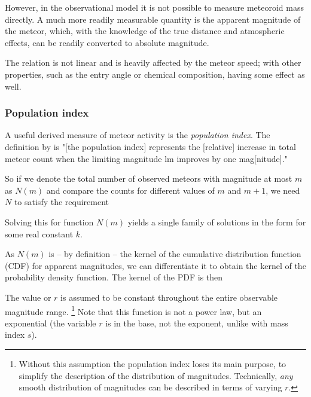             However, in the observational model it is not possible to measure meteoroid mass directly.
            A much more readily measurable quantity is the apparent magnitude of the meteor, which,
            with the knowledge of the true distance and atmospheric effects, can be readily converted
            to absolute magnitude.

            The relation is not linear and is heavily affected by the meteor speed; with other properties,
            such as the entry angle or chemical composition, having some effect as well.

        \subsubsection{Population index} \label{msar}
            A useful derived measure of meteor activity is the \emph{population index}.
            The definition by \citet{molau2015} is "[the population index] represents the [relative] increase
            in total meteor count when the limiting magnitude $\mathrm{lm}$ improves by one mag[nitude]."

            So if we denote the total number of observed meteors with magnitude at most $m$ as $N(m)$
            and compare the counts for different values of $m$ and $m + 1$, we need $N$ to satisfy the requirement

            Solving this for function $N(m)$ yields a single family of solutions
            in the form
            for some real constant $k$.

            As $N(m)$ is -- by definition -- the kernel of the
            cumulative distribution function (CDF) for apparent magnitudes, we can differentiate it
            to obtain the kernel of the probability density function. The kernel of the PDF is then

            The value or $r$ is assumed to be constant throughout the entire observable magnitude range.%
            \footnote{Without this assumption the population index loses its main purpose,
            to simplify the description of the distribution of magnitudes.
            Technically, \emph{any} smooth distribution of magnitudes can be described in terms of varying $r$.}
            Note that this function is not a power law, but an exponential (the variable $r$
            is in the base, not the exponent, unlike with mass index $s$).

